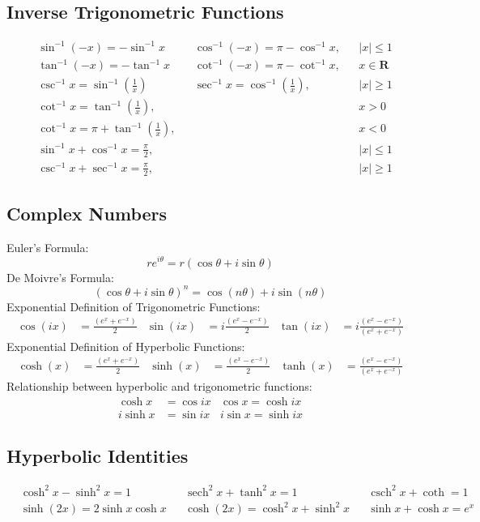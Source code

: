 \documentclass[12pt]{article}
\DeclareMathOperator{\sech}{sech}
\DeclareMathOperator{\csch}{csch}
\begin{document}
\subsection{Inverse Trigonometric Functions}
\begin{align*}
	&\sin^{-1}(-x) =-\sin^{-1}x &   &\cos^{-1}(-x) =\pi-\cos^{-1}x, & &\lvert x\rvert\leq 1 \\
	&\tan^{-1}(-x) =-\tan^{-1}x &   &\cot^{-1}(-x) =\pi-\cot^{-1}x,& &x\in\mathbf{R} \\ 
	&\csc^{-1}x =\sin^{-1}\left(\frac{1}{x}\right) & &\sec^{-1}x =\cos^{-1}\left(\frac{1}{x}\right),& &\lvert x\rvert\geq1 \\ &\cot^{-1}x =\tan^{-1}\left(\frac{1}{x}\right),& & & &x>0 \\ 
	&\cot^{-1}x =\pi+\tan^{-1}\left(\frac{1}{x}\right),& & & &x<0 \\ 
	&\sin^{-1}x+\cos^{-1}x =\frac{\pi}{2},& & &  &\lvert x\rvert\leq1 \\ 
	&\csc^{-1}x+\sec^{-1}x =\frac{\pi}{2},& & & &\lvert x\rvert\geq1 
\end{align*}



\subsection{Complex Numbers}
Euler's Formula:
$$re^{i\theta} = r(\cos\theta + i\sin\theta)$$
De Moivre's Formula:
$${(\cos\theta + i\sin\theta)}^n = \cos{(n\theta)} + i\sin{(n\theta)}$$
Exponential Definition of Trigonometric Functions:
\begin{align*}
\cos{(ix)} &= \frac{(e^x + e^{-x})}{2} & \sin{(ix)} &= i\frac{(e^x - e^{-x})}{2} & \tan{(ix)} &= i\frac{(e^x - e^{-x})}{(e^x + e^{-x})}
\end{align*}
Exponential Definition of Hyperbolic Functions:
\begin{align*}
\cosh{(x)} &= \frac{(e^x + e^{-x})}{2} & \sinh{(x)} &= \frac{(e^x - e^{-x})}{2} & \tanh{(x)} &= \frac{(e^x - e^{-x})}{(e^x + e^{-x})}
\end{align*}
Relationship between hyperbolic and trigonometric functions:
\begin{align*}
\cosh x &= \cos{ix} & \cos x = \cosh{ix} \\
i\sinh x &= \sin{ix} & i\sin{x} = \sinh{ix} 
\end{align*}

\subsection{Hyperbolic Identities}
\begin{align*}
&\cosh^2 x - \sinh^2 x = 1 & &\sech^2x + \tanh^2x = 1 & &\csch^2x + \coth = 1\\
&\sinh{(2x)} = 2\sinh x\cosh x & &\cosh{(2x)} = \cosh^2x + \sinh^2{x} & &\sinh x + \cosh x = e^x \\
\end{align*}
\end{document}
